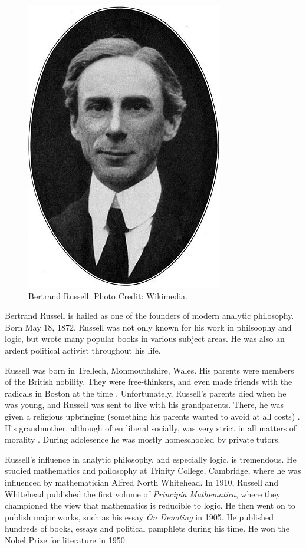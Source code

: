 \documentclass[../../../include/open-logic-section]{subfiles}
\begin{document}
\begin{figure}[h!] 
\centering
\includegraphics[scale=0.4]{bertrand-russell.jpg}
 \caption{Bertrand Russell. Photo Credit: Wikimedia.} 
\end{figure} 

Bertrand Russell is hailed
as one of the founders of modern analytic philosophy. Born May 18, 1872,
Russell was not only known for his work in philsoophy and logic, but wrote
many popular books in various subject areas. He was also an ardent
political activist throughout his life.

Russell was born in Trellech, Monmouthshire, Wales. His parents were
members of the British nobility. They were free-thinkers, and even made
friends with the radicals in Boston at the time \cite[9]{Russell1967}.
Unfortunately, Russell's parents died when he was young, and Russell was
sent to live with his grandparents. There, he was given a religious
upbringing (something his parents wanted to avoid at all costs)
\citep[11]{Russell1967}. His grandmother, although often liberal socially,
was very strict in all matters of morality \citep[15]{Russell1967}. During
adolesence he was mostly homeschooled by private tutors.

Russell's influence in analytic philosophy, and especially logic, is
tremendous. He studied mathematics and philosophy at Trinity College,
Cambridge, where he was influenced by mathematician Alfred North Whitehead.
In 1910, Russell and Whitehead published the first volume of
\emph{Principia Mathematica}, where they championed the view that
mathematics is reducible to logic. He then went on to publish major works,
such as his essay \emph{On Denoting} in 1905. He published 
hundreds of books, essays and political pamphlets during his time. He won
the Nobel Prize for literature in 1950.
\end{document}
